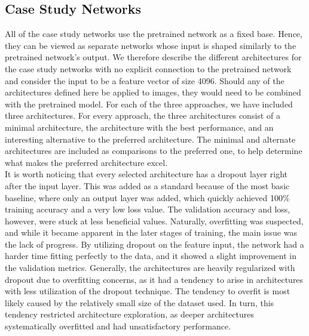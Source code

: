 


\subsection{Case Study Networks} \label{sec:case-networks}

All of the case study networks use the pretrained network as a fixed base. Hence, they can be viewed as separate networks whose input is shaped similarly to the pretrained network's output. We therefore describe the different architectures for the case study networks with no explicit connection to the pretrained network and consider the input to be a feature vector of size 4096. Should any of the architectures defined here be applied to images, they would need to be combined with the pretrained model. For each of the three approaches, we have included three architectures. For every approach, the three architectures consist of a minimal architecture, the architecture with the best performance, and an interesting alternative to the preferred architecture. The minimal and alternate architectures are included as comparisons to the preferred one, to help determine what makes the preferred architecture excel. \\

\noindent It is worth noticing that every selected architecture has a dropout layer right after the input layer. This was added as a standard because of the most basic baseline, where only an output layer was added, which quickly achieved 100\% training accuracy and a very low loss value. The validation accuracy and loss, however, were stuck at less beneficial values. Naturally, overfitting was suspected, and while it became apparent in the later stages of training, the main issue was the lack of progress. By utilizing dropout on the feature input, the network had a harder time fitting perfectly to the data, and it showed a slight improvement in the validation metrics. Generally, the architectures are heavily regularized with dropout due to overfitting concerns, as it had a tendency to arise in architectures with less utilization of the dropout technique. The tendency to overfit is most likely caused by the relatively small size of the dataset used. In turn, this tendency restricted architecture exploration, as deeper architectures systematically overfitted and had unsatisfactory performance. \\

